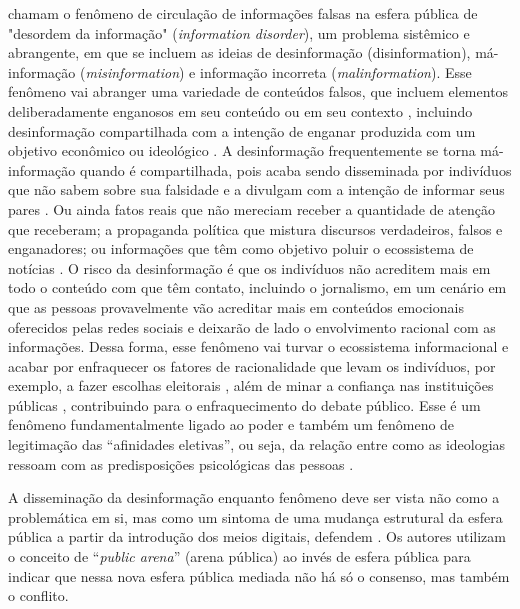 \documentclass[portuguese]{textolivre}
\begin{document}
\textcite{wardle_reflexao_2019} chamam o fenômeno de circulação de informações falsas na esfera pública de "desordem da informação" (\emph{information disorder}), um problema sistêmico e abrangente, em que se incluem as ideias de desinformação (disinformation), má-informação (\emph{misinformation}) e informação incorreta (\emph{malinformation}). Esse fenômeno vai abranger uma variedade de conteúdos falsos, que incluem elementos deliberadamente enganosos em seu conteúdo ou em seu contexto \cite{bakir_fake_2018}, incluindo desinformação compartilhada com a intenção de enganar \cite{wardle_reflexao_2019} produzida com um objetivo econômico ou ideológico \cite{tandoc_defining_2018}. A desinformação frequentemente se torna má-informação quando é compartilhada, pois acaba sendo disseminada por indivíduos que não sabem sobre sua falsidade e a divulgam com a intenção de informar seus pares \cite{wardle_reflexao_2019}. Ou ainda fatos reais que não mereciam receber a quantidade de atenção que receberam; a propaganda política que mistura discursos verdadeiros, falsos e enganadores; ou informações que têm como objetivo poluir o ecossistema de notícias \cite{zuckerman2017fake}. O risco da desinformação é que os indivíduos não acreditem mais em todo o conteúdo com que têm contato, incluindo o jornalismo, em um cenário em que as pessoas provavelmente vão acreditar mais em conteúdos emocionais oferecidos pelas redes sociais e deixarão de lado o envolvimento racional com as informações. Dessa forma, esse fenômeno vai turvar o ecossistema informacional e acabar por enfraquecer os fatores de racionalidade que levam os indivíduos, por exemplo, a fazer escolhas eleitorais \cite{ireton2019}, além de minar a confiança nas instituições públicas \cite{rivas-de-roca_comunicacion_2022}, contribuindo para o enfraquecimento do debate público. Esse é um fenômeno fundamentalmente ligado ao poder \cite{kuo_critical_2021} e também um fenômeno de legitimação das “afinidades eletivas”, ou seja, da relação entre como as ideologias ressoam com as predisposições psicológicas das pessoas \cite{zmigrod_cognitive_2021}.

A disseminação da desinformação enquanto fenômeno deve ser vista não como a problemática em si, mas como um sintoma de uma mudança estrutural da esfera pública a partir da introdução dos meios digitais, defendem \textcite{jungherr_disinformation_2021}. Os autores utilizam o conceito de “\emph{public arena}” (arena pública) ao invés de esfera pública para indicar que nessa nova esfera pública mediada não há só o consenso, mas também o conflito.
\end{document}
